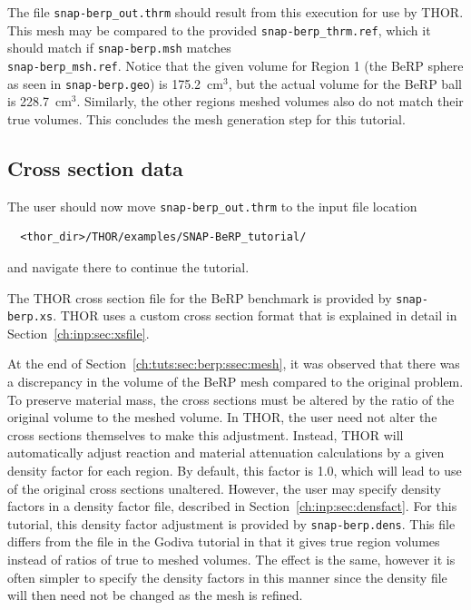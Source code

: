 The file \verb"snap-berp_out.thrm" should result from this execution for use by \ac{THOR}.
This mesh may be compared to the provided \verb"snap-berp_thrm.ref", which it should match if \verb"snap-berp.msh" matches \\
\verb"snap-berp_msh.ref".
Notice that the given volume for Region 1 (the BeRP sphere as seen in \verb"snap-berp.geo") is 175.2~cm$^3$, but the actual volume for the BeRP ball is 228.7~cm$^3$.
Similarly, the other regions meshed volumes also do not match their true volumes.
This concludes the mesh generation step for this tutorial.

\subsection{Cross section data}

The user should now move \verb"snap-berp_out.thrm" to the input file location
\begin{verbatim}
  <thor_dir>/THOR/examples/SNAP-BeRP_tutorial/
\end{verbatim}
and navigate there to continue the tutorial.

The \ac{THOR} cross section file for the BeRP benchmark is provided by \verb"snap-berp.xs".
\ac{THOR} uses a custom cross section format that is explained in detail in Section~\ref{ch:inp:sec:xsfile}.

At the end of Section~\ref{ch:tuts:sec:berp:ssec:mesh}, it was observed that there was a discrepancy in the volume of the BeRP mesh compared to the original problem.
To preserve material mass, the cross sections must be altered by the ratio of the original volume to the meshed volume.
In \ac{THOR}, the user need not alter the cross sections themselves to make this adjustment.
Instead, \ac{THOR} will automatically adjust reaction and material attenuation calculations by a given density factor for each region.
By default, this factor is 1.0, which will lead to use of the original cross sections unaltered.
However, the user may specify density factors in a density factor file, described in Section~\ref{ch:inp:sec:densfact}.
For this tutorial, this density factor adjustment is provided by \verb"snap-berp.dens".
This file differs from the file in the Godiva tutorial in that it gives true region volumes instead of ratios of true to meshed volumes.
The effect is the same, however it is often simpler to specify the density factors in this manner since the density file will then need not be changed as the mesh is refined.

